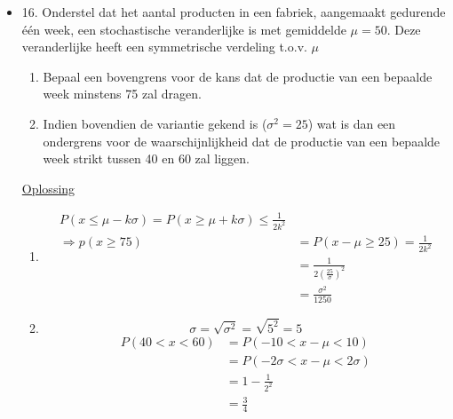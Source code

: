 \documentclass[12pt]{report}
\newcommand{\exercise}[2]{
  #1
  

  \underline{Oplossing}
  
  #2
  
    \hrulefill
}
\begin{document}
\begin{itemize}
{{    }
}
\item {
    \exercise{
        16. Onderstel dat het aantal producten in een fabriek, aangemaakt gedurende één week, een stochastische veranderlijke is met gemiddelde $\mu = 50$. Deze veranderlijke heeft een symmetrische verdeling t.o.v. $\mu$
        \begin{enumerate}
         \item Bepaal een bovengrens voor de kans dat de productie van een bepaalde week minstens 75 zal dragen.
         \item Indien bovendien de variantie gekend is ($\sigma^2 = 25$) wat is dan een ondergrens voor de waarschijnlijkheid dat de productie van een bepaalde week strikt tussen 40 en 60 zal liggen.
        \end{enumerate}
    }{
        \begin{enumerate}
         \item \begin{equation*}
                \begin{split}
                P(x \leq \mu - k\sigma) = P(x \geq \mu + k\sigma) \leq \frac{1}{2k^2} \\
                \Rightarrow p(x \geq 75) & = P(x -\mu \geq 25) = \frac{1}{2k^2} \\
                                        & = \frac{1}{2(\frac{25}{\sigma})^2} \\
                                        & = \frac{\sigma^2}{1250}
                \end{split}
                \end{equation*}
        \item 
            $$\sigma = \sqrt{\sigma^2} = \sqrt{5^2} = 5$$
             \begin{equation*}
               \begin{split}
                P(40 < x < 60) & = P(-10 < x - \mu < 10) \\
                               & = P(-2\sigma < x - \mu < 2\sigma) \\
                               & = 1 - \frac{1}{2^2} \\
                               & = \frac{3}{4}
               \end{split}
              \end{equation*}

        \end{enumerate}


    }
}
\end{itemize}
\end{document}
